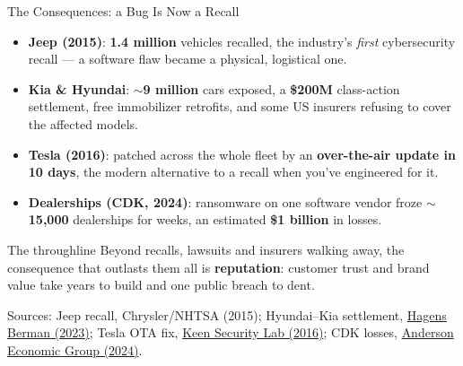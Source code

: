 \begin{frame}{The Consequences: a Bug Is Now a Recall}
  \small
  \setlength{\itemsep}{2pt}
  \begin{itemize}\setlength{\itemsep}{2pt}
    \item \textbf{Jeep (2015)}: \textbf{1.4 million} vehicles recalled, the industry's \emph{first} cybersecurity recall --- a software flaw became a physical, logistical one.
    \item \textbf{Kia \& Hyundai}: \textbf{$\sim$9 million} cars exposed, a \textbf{\$200M} class-action settlement, free immobilizer retrofits, and some US insurers refusing to cover the affected models.
    \item \textbf{Tesla (2016)}: patched across the whole fleet by an \textbf{over-the-air update in 10 days}, the modern alternative to a recall when you've engineered for it.
    \item \textbf{Dealerships (CDK, 2024)}: ransomware on one software vendor froze \textbf{$\sim$15,000} dealerships for weeks, an estimated \textbf{\$1 billion} in losses.
  \end{itemize}
  \begin{alertblock}{The throughline}
    Beyond recalls, lawsuits and insurers walking away, the consequence that outlasts them all is \textbf{reputation}: customer trust and brand value take years to build and one public breach to dent.
  \end{alertblock}
  {\scriptsize\color{tumgrey} Sources: Jeep recall, Chrysler/NHTSA (2015); Hyundai--Kia settlement, \href{https://hbsslaw.com/press/hyundai-kia-car-theft-defect/hyundai-kia-theft-class-action-lawsuit-reaches-settlement-valued-at-more-than-200-million}{Hagens Berman (2023)}; Tesla OTA fix, \href{https://keenlab.tencent.com/en/2016/09/19/Keen-Security-Lab-of-Tencent-Car-Hacking-Research-Remote-Attack-to-Tesla-Cars/}{Keen Security Lab (2016)}; CDK losses, \href{https://www.foxbusiness.com/markets/car-dealership-losses-from-cdk-software-outage-could-reach-1-billion-study-finds}{Anderson Economic Group (2024)}.}
\end{frame}

